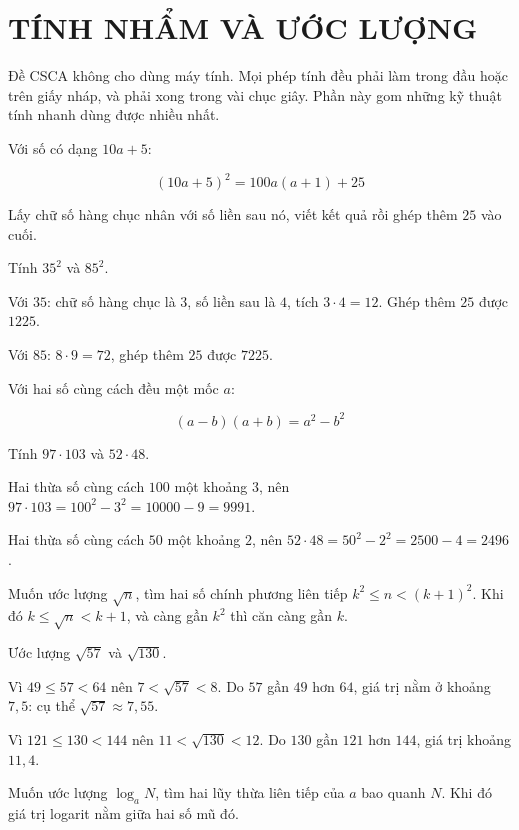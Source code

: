 \documentclass[11pt, a4paper]{article}
\begin{document}

\section{TÍNH NHẨM VÀ ƯỚC LƯỢNG}

Đề CSCA không cho dùng máy tính. Mọi phép tính đều phải làm trong đầu hoặc trên giấy nháp, và phải xong trong vài chục giây. Phần này gom những kỹ thuật tính nhanh dùng được nhiều nhất.

\begin{dinhly}
Với số có dạng $10a + 5$:

$$(10a+5)^2 = 100a(a+1) + 25$$

Lấy chữ số hàng chục nhân với số liền sau nó, viết kết quả rồi ghép thêm $25$ vào cuối.
\end{dinhly}
\begin{vidu}[{1}]
Tính $35^2$ và $85^2$.

Với $35$: chữ số hàng chục là $3$, số liền sau là $4$, tích $3 \cdot 4 = 12$. Ghép thêm $25$ được $1225$.

Với $85$: $8 \cdot 9 = 72$, ghép thêm $25$ được $7225$.

\begin{dinhly}
Với hai số cùng cách đều một mốc $a$:

$$(a-b)(a+b) = a^2 - b^2$$
\end{dinhly}
\end{vidu}
\begin{vidu}[{2}]
Tính $97 \cdot 103$ và $52 \cdot 48$.

Hai thừa số cùng cách $100$ một khoảng $3$, nên $97 \cdot 103 = 100^2 - 3^2 = 10000 - 9 = 9991$.

Hai thừa số cùng cách $50$ một khoảng $2$, nên $52 \cdot 48 = 50^2 - 2^2 = 2500 - 4 = 2496$.

\begin{dinhly}
Muốn ước lượng $\sqrt{n}$, tìm hai số chính phương liên tiếp $k^2 \le n < (k+1)^2$. Khi đó $k \le \sqrt{n} < k+1$, và càng gần $k^2$ thì căn càng gần $k$.
\end{dinhly}
\end{vidu}
\begin{vidu}[{3}]
Ước lượng $\sqrt{57}$ và $\sqrt{130}$.

Vì $49 \le 57 < 64$ nên $7 < \sqrt{57} < 8$. Do $57$ gần $49$ hơn $64$, giá trị nằm ở khoảng $7,5$: cụ thể $\sqrt{57} \approx 7,55$.

Vì $121 \le 130 < 144$ nên $11 < \sqrt{130} < 12$. Do $130$ gần $121$ hơn $144$, giá trị khoảng $11,4$.

\begin{dinhly}
Muốn ước lượng $\log_a N$, tìm hai lũy thừa liên tiếp của $a$ bao quanh $N$. Khi đó giá trị logarit nằm giữa hai số mũ đó.
\end{dinhly}
\end{vidu}
\end{document}
